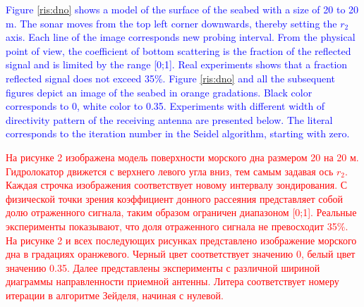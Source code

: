 \documentclass{procDDs}
\begin{document}
\textcolor{blue}{Figure \ref{ris:dno} shows a model of the surface of the seabed with a size of 20 to 20 m. The sonar moves from the top left corner downwards, thereby setting the $ r_2 $ axis. Each line of the image corresponds new probing interval. From the physical point of view, the coefficient of bottom scattering is the fraction of the reflected signal and is limited by the range [0;1]. Real experiments shows that a fraction reflected signal does not exceed 35\%. Figure \ref{ris:dno} and all the subsequent figures depict an image of the seabed in orange gradations. Black color corresponds to 0, white color to 0.35. Experiments with different width of directivity pattern of the receiving antenna are presented below. The literal corresponds to the iteration number in the Seidel algorithm, starting with zero.}

\textcolor{red}{На рисунке 2 изображена модель поверхности морского дна размером 20 на 20 м. Гидролокатор движется с верхнего левого угла вниз, тем самым задавая ось $r_2$. Каждая строчка изображения соответствует новому интервалу зондирования. С физической точки зрения коэффициент донного рассеяния представляет собой долю отраженного сигнала, таким образом ограничен диапазоном [0;1]. Реальные эксперименты показывают, что доля отраженного сигнала не превосходит 35\%. На рисунке 2 и всех последующих рисунках представлено изображение морского дна в градациях оранжевого. Черный цвет соответствует значению 0, белый цвет значению 0.35. Далее представлены эксперименты с различной шириной диаграммы направленности приемной антенны. Литера соответствует номеру итерации в алгоритме Зейделя, начиная с нулевой.}
\end{document}
